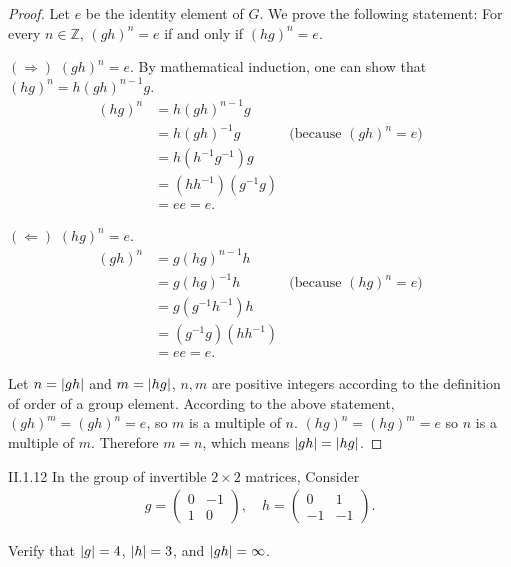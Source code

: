 \begin{proof}
    Let $e$ be the identity element of $G$. We prove the following statement: For every $n\in \mathbb{Z}$, ${(gh)}^{n} = e$ if and only if ${(hg)}^{n} = e$.

    $(\Longrightarrow)$ ${(gh)}^{n} = e$. By mathematical induction, one can show that ${(hg)}^{n} = h{(gh)}^{n-1}g$.
    \begin{align*}
        {(hg)}^{n} & = h{(gh)}^{n-1}g \\
                   & = h{(gh)}^{-1}g & \text{(because ${(gh)}^{n} = e$)} \\
                   & = h(h^{-1}g^{-1})g \\
                   & = {(hh^{-1})}{(g^{-1}g)} \\
                   & = ee = e.
    \end{align*}

    $(\Longleftarrow)$ ${(hg)}^{n} = e$.
    \begin{align*}
        {(gh)}^{n} & = g{(hg)}^{n-1}h \\
                   & = g{(hg)}^{-1}h & \text{(because ${(hg)}^{n} = e$)} \\
                   & = g{(g^{-1}h^{-1})}h \\
                   & = {(g^{-1}g)}{(hh^{-1})} \\
                   & = ee = e.
    \end{align*}

    Let $n = \left\vert{gh}\right\vert$ and $m = \left\vert{hg}\right\vert$, $n, m$ are positive integers according to the definition of order of a group element. According to the above statement, ${(gh)}^{m} = {(gh)}^{n} = e$, so $m$ is a multiple of $n$. ${(hg)}^{n} = {(hg)}^{m} = e$ so $n$ is a multiple of $m$. Therefore $m = n$, which means $\left\vert{gh}\right\vert = \left\vert{hg}\right\vert$.
\end{proof}

\begin{exercise}{II.1.12}
	In the group of invertible $2\times 2$ matrices, Consider
	\begin{align*}
		g = \begin{pmatrix}
			    0 & -1 \\
			    1 & 0
		    \end{pmatrix}, \quad
		h = \begin{pmatrix}
			    0  & 1  \\
			    -1 & -1
		    \end{pmatrix}.
	\end{align*}

	Verify that $\left\vert{g}\right\vert = 4$, $\left\vert{h}\right\vert = 3$, and $\left\vert{gh}\right\vert = \infty$.
\end{exercise}

